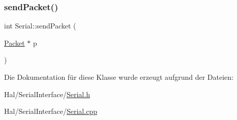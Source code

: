 \hypertarget{class_serial_a18fe9cf8fc366e6691b6ddf5e9b473a1}{}\label{class_serial_a18fe9cf8fc366e6691b6ddf5e9b473a1} 
\subsubsection{\texorpdfstring{send\+Packet()}{sendPacket()}}
{\footnotesize\ttfamily int Serial\+::send\+Packet (\begin{DoxyParamCaption}\item[{\hyperlink{struct_packet}{Packet} $\ast$}]{p }\end{DoxyParamCaption})}



Die Dokumentation für diese Klasse wurde erzeugt aufgrund der Dateien\+:\begin{DoxyCompactItemize}
\item 
Hal/\+Serial\+Interface/\hyperlink{_serial_8h}{Serial.\+h}\item 
Hal/\+Serial\+Interface/\hyperlink{_serial_8cpp}{Serial.\+cpp}\end{DoxyCompactItemize}
